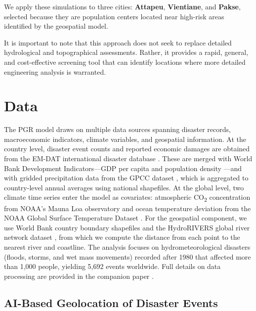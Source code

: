 \documentclass[11pt,a4paper]{article}
\begin{document}
We apply these simulations to three cities: \textbf{Attapeu}, \textbf{Vientiane}, and \textbf{Pakse}, selected because they are population centers located near high-risk areas identified by the geospatial model.

It is important to note that this approach does not seek to replace detailed hydrological and topographical assessments. Rather, it provides a rapid, general, and cost-effective screening tool that can identify locations where more detailed engineering analysis is warranted.

\section{Data}

The PGR model draws on multiple data sources spanning disaster records, macroeconomic indicators, climate variables, and geospatial information. At the country level, disaster event counts and reported economic damages are obtained from the EM-DAT international disaster database \cite{emdat2024}. These are merged with World Bank Development Indicators---GDP per capita and population density \cite{worldbank_wdi_2024}---and with gridded precipitation data from the GPCC dataset \cite{gpcc_2022}, which is aggregated to country-level annual averages using national shapefiles. At the global level, two climate time series enter the model as covariates: atmospheric CO\textsubscript{2} concentration from NOAA's Mauna Loa observatory \cite{noaa_co2_2024} and ocean temperature deviation from the NOAA Global Surface Temperature Dataset \cite{zhang_noaa_2019}. For the geospatial component, we use World Bank country boundary shapefiles \cite{worldbank_wdi_2024} and the HydroRIVERS global river network dataset \cite{lehner2013}, from which we compute the distance from each point to the nearest river and coastline. The analysis focuses on hydrometeorological disasters (floods, storms, and wet mass movements) recorded after 1980 that affected more than 1,000 people, yielding 5,692 events worldwide. Full details on data processing are provided in the companion paper \cite{saldarriaga2026}.

\subsection{AI-Based Geolocation of Disaster Events}
\end{document}
